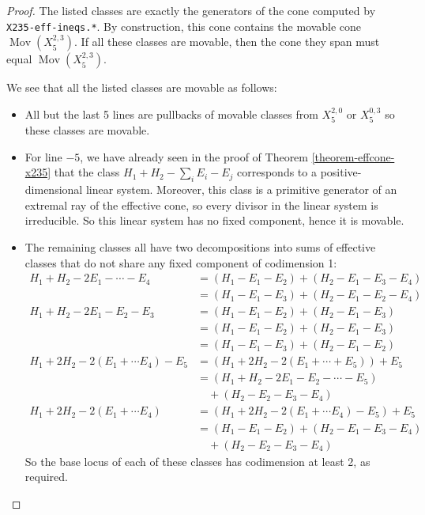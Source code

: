 \documentclass[a4paper,11pt]{article}
\newcommand{\Mov}{\operatorname{Mov}}
\begin{document}
\begin{proof}
The listed classes are exactly the generators of the cone computed by {\tt X235-eff-ineqs.*}. By construction, this cone contains the movable cone $\Mov(X^{2,3}_5)$. If all these classes are movable, then the cone they span must equal $\Mov(X^{2,3}_5)$.

We see that all the listed classes are movable as follows:
\begin{itemize}
    \item All but the last 5 lines are pullbacks of movable classes from $X^{2,0}_5$ or $X^{0,3}_5$ so these classes are movable.
    \item For line $-5$, we have already seen in the proof of Theorem \ref{theorem-effcone-x235} that the class $H_1+H_2-\sum_i E_i -E_j$ corresponds to a positive-dimensional linear system. Moreover, this class is a primitive generator of an extremal ray of the effective cone, so every divisor in the linear system is irreducible. So this linear system has no fixed component, hence it is movable.
    \item The remaining classes all have two decompositions into sums of effective classes that do not share any fixed component of codimension 1:
    \begin{align*}
        H_1+H_2-2E_1-\cdots-E_4 &= \left(H_1-E_1-E_2 \right) + \left(H_2-E_1-E_3-E_4 \right)\\
                                &= \left(H_1-E_1-E_3 \right) + \left(H_2-E_1-E_2-E_4 \right)\\
        H_1+H_2-2E_1-E_2-E_3    &= \left(H_1-E_1-E_2 \right) + \left(H_2-E_1-E_3\right)\\
                                &= \left(H_1-E_1-E_2 \right) + \left(H_2-E_1-E_3\right)\\
                                &= \left(H_1-E_1-E_3 \right) + \left(H_2-E_1-E_2\right)\\
 H_1+2H_2-2(E_1+\cdots E_4)-E_5 &= \left(H_1+2H_2-2(E_1+\cdots+E_5)\right)+E_5\\
                                &= \left(H_1+H_2-2E_1-E_2-\cdots-E_5 \right)\\ & \quad +\left(H_2-E_2-E_3-E_4 \right)\\
 H_1+2H_2-2(E_1+\cdots E_4)     &= \left(H_1+2H_2-2(E_1+\cdots E_4)-E_5 \right) + E_5\\
                                 &=\left(H_1-E_1-E_2\right)+\left( H_2-E_1-E_3-E_4\right)\\ & \quad +\left( H_2-E_2-E_3-E_4\right)                             
    \end{align*}
    So the base locus of each of these classes has codimension at least 2, as required. 
\end{itemize}
   \end{proof}
\end{document}
